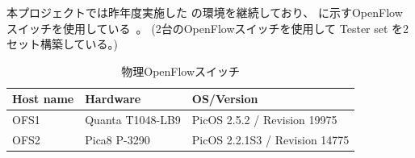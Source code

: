 本プロジェクトでは昨年度実施した \lopj の環境を継続しており、
に示すOpenFlowスイッチを使用している~\cite{l1pjpoc}。
(2台のOpenFlowスイッチを使用して Tester set を2セット構築している。)

\begin{table}[h]
 \centering
 \caption{物理OpenFlowスイッチ}
 \label{tab:psw-list}
  \begin{tabular}{l|l|l}
   \hline
   Host name & Hardware & OS/Version \\
   \hline
   \hline
   OFS1 & Quanta T1048-LB9 & PicOS 2.5.2 / Revision 19975 \\
   OFS2 & Pica8 P-3290 & PicOS 2.2.1S3 / Revision 14775 \\
   \hline
 \end{tabular}
\end{table}

